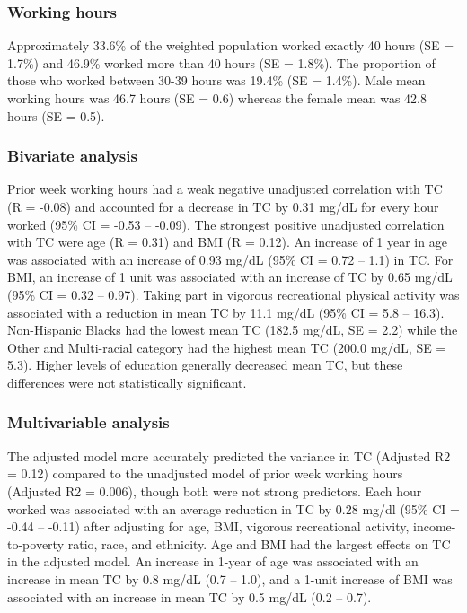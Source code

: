 \documentclass[]{elsarticle} %
\begin{document}
\hypertarget{working-hours-1}{%
\subsubsection{Working hours}\label{working-hours-1}}

Approximately 33.6\% of the weighted population worked exactly 40 hours
(SE = 1.7\%) and 46.9\% worked more than 40 hours (SE = 1.8\%). The
proportion of those who worked between 30-39 hours was 19.4\% (SE =
1.4\%). Male mean working hours was 46.7 hours (SE = 0.6) whereas the
female mean was 42.8 hours (SE = 0.5).

\hypertarget{bivariate-analysis}{%
\subsubsection{Bivariate analysis}\label{bivariate-analysis}}

Prior week working hours had a weak negative unadjusted correlation with
TC (R = -0.08) and accounted for a decrease in TC by 0.31 mg/dL for
every hour worked (95\% CI = -0.53 -- -0.09). The strongest positive
unadjusted correlation with TC were age (R = 0.31) and BMI (R = 0.12).
An increase of 1 year in age was associated with an increase of 0.93
mg/dL (95\% CI = 0.72 -- 1.1) in TC. For BMI, an increase of 1 unit was
associated with an increase of TC by 0.65 mg/dL (95\% CI = 0.32 --
0.97). Taking part in vigorous recreational physical activity was
associated with a reduction in mean TC by 11.1 mg/dL (95\% CI = 5.8 --
16.3). Non-Hispanic Blacks had the lowest mean TC (182.5 mg/dL, SE =
2.2) while the Other and Multi-racial category had the highest mean TC
(200.0 mg/dL, SE = 5.3). Higher levels of education generally decreased
mean TC, but these differences were not statistically significant.

\hypertarget{multivariable-analysis}{%
\subsubsection{Multivariable analysis}\label{multivariable-analysis}}

The adjusted model more accurately predicted the variance in TC
(Adjusted R2 = 0.12) compared to the unadjusted model of prior week
working hours (Adjusted R2 = 0.006), though both were not strong
predictors. Each hour worked was associated with an average reduction in
TC by 0.28 mg/dl (95\% CI = -0.44 -- -0.11) after adjusting for age,
BMI, vigorous recreational activity, income-to-poverty ratio, race, and
ethnicity. Age and BMI had the largest effects on TC in the adjusted
model. An increase in 1-year of age was associated with an increase in
mean TC by 0.8 mg/dL (0.7 -- 1.0), and a 1-unit increase of BMI was
associated with an increase in mean TC by 0.5 mg/dL (0.2 -- 0.7).
\end{document}

